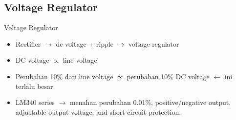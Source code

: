 \subsection{Voltage Regulator}
\begin{frame}{Voltage Regulator}
	\begin{itemize}
		\item Rectifier $ \rightarrow $ dc voltage + ripple $ \rightarrow $ voltage regulator
		\item DC voltage $ \propto $ line voltage
		\item Perubahan 10\% dari line voltage $ \propto $ perubahan 10\% DC voltage $ \leftarrow $ ini terlalu besar
		\item LM340 series $ \rightarrow $ menahan perubahan 0.01\%, positive/negative output, adjustable output voltage, and short-circuit protection.
	\end{itemize}
\end{frame}